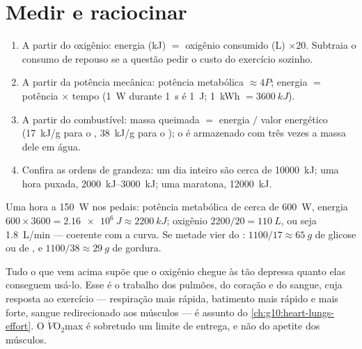 \section{Medir e raciocinar}

\begin{method}\label{met:g10:exercise-and-energy:calc}
\begin{enumerate}
  \item A partir do oxigênio: energia (\unit{kJ}) $=$ oxigênio
        consumido (\unit{L}) $\times 20$. Subtraia o consumo de repouso
        se a questão pedir o custo do exercício sozinho.
  \item A partir da potência mecânica: potência metabólica
        $\approx 4 P$; energia $=$ potência $\times$ tempo
        (\qty{1}{W} durante \qty{1}{s} é \qty{1}{J};
        \qty{1}{kWh} $= \qty{3600}{kJ}$).
  \item A partir do combustível: massa queimada $=$ energia $/$ valor
        energético (\qty{17}{kJ/g} para o , \qty{38}{kJ/g}
        para o ); o  é armazenado com três vezes a
        massa dele em água.
  \item Confira as ordens de grandeza: um dia inteiro são cerca de
        \qty{10000}{kJ}; uma hora puxada, \qtyrange{2000}{3000}{kJ};
        uma maratona, \qty{12000}{kJ}.
\end{enumerate}
\end{method}

\begin{example}\label{ex:g10:exercise-and-energy:hour}
Uma hora a \qty{150}{W} nos pedais: potência metabólica de cerca de
\qty{600}{W}, energia $600 \times 3600 = \qty{2.16e6}{J} \approx
\qty{2200}{kJ}$; oxigênio $2200/20 = \qty{110}{L}$, ou seja
\qty{1.8}{L/min} --- coerente com a curva. Se metade vier do
: $1100/17 \approx \qty{65}{g}$ de glicose ou de
, e $1100/38 \approx \qty{29}{g}$ de gordura.
\end{example}

\begin{remark}\label{rem:g10:exercise-and-energy:delivery}
Tudo o que vem acima supõe que o oxigênio chegue às  tão
depressa quanto elas conseguem usá-lo. Esse é o trabalho dos pulmões,
do coração e do sangue, cuja resposta ao exercício --- respiração mais
rápida, batimento mais rápido e mais forte, sangue redirecionado aos
músculos --- é assunto do \cref{ch:g10:heart-lungs-effort}. O
$\dot V\!\mathrm{O_2}$max é sobretudo um limite de entrega, e não do
apetite dos músculos.
\end{remark}

